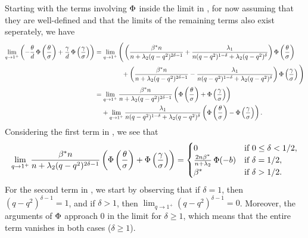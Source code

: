 Starting with the terms involving \(\operatorname{\Phi}\) inside the limit in , for
now assuming that they are well-defined and that the limits of the remaining terms also
exist seperately, we have
\begin{align}
  \lim_{q \rightarrow 1^+} \left(-\frac{\theta}{d} \cdf\left(\frac{\theta}{\sigma}\right) + \frac{\gamma}{d} \cdf \left(\frac{\gamma}{\sigma}\right)\right)
   & = \lim_{q \rightarrow 1^+} \Bigg(\left(\frac{\beta^* n}{n + \lambda_2 (q-q^2)^{2\delta - 1}} + \frac{\lambda_1}{n(q-q^2)^{1-\delta} + \lambda_2 (q-q^2)^{\delta}} \right) \cdf \left(\frac{\theta}{\sigma}\right)  \nonumber                                                                                                                                                                                    \\
   & \phantom{= \lim_{q \rightarrow 1^+} \Bigg( } + \left(\frac{\beta^* n}{n + \lambda_2 (q-q^2)^{2\delta - 1}} - \frac{\lambda_1}{n(q-q^2)^{1-\delta} + \lambda_2 (q-q^2)^{\delta}} \right)\cdf \left(\frac{\gamma}{\sigma}\right) \Bigg) \nonumber                                                                                                                                                                 \\
   & = \lim_{q \rightarrow 1^+} \frac{\beta^*n}{n + \lambda_2 (q-q^2)^{2\delta - 1}}\left(\cdf \left(\frac{\theta}{\sigma}\right) + \cdf \left(\frac{\gamma}{\sigma}\right) \right)                                                                                                                                                                                                                        \nonumber \\
   & \phantom{={}} +  \lim_{q \rightarrow 1^+}\frac{\lambda_1}{n(q-q^2)^{1-\delta} + \lambda_2(q -q^2)^{\delta}} \left(\cdf \left(\frac{\theta}{\sigma}\right) - \cdf \left(\frac{\gamma}{\sigma}\right)\right). \label{eq:eval-qlimit-terms}
\end{align}
Considering the first term in , we see that
\[
  \lim_{q \rightarrow 1^+} \frac{\beta^*n}{n + \lambda_2 (q-q^2)^{2\delta - 1}}\left(\operatorname{\Phi} \left(\frac{\theta}{\sigma}\right) + \operatorname{\Phi} \left(\frac{\gamma}{\sigma}\right) \right)  =
  \begin{cases}
    0                                          & \text{if } 0 \leq \delta < 1/2, \\
    \frac{2n \beta^*}{n + \lambda_2} \operatorname{\Phi} (-b) & \text{if } \delta = 1/2,        \\
    \beta^*                                    & \text{if } \delta > 1/2.
  \end{cases}
\]
For the second term in , we start by observing that if \(\delta
= 1\), then \((q - q^2)^{\delta - 1} = 1\), and if \(\delta > 1\), then
\(\lim_{q\rightarrow 1^+}(q - q^2)^{\delta - 1} = 0\). Moreover, the arguments of \(\operatorname{\Phi}\)
approach 0 in the limit for \(\delta \geq 1\), which means that the entire term vanishes in
both cases (\(\delta \geq 1\)).

